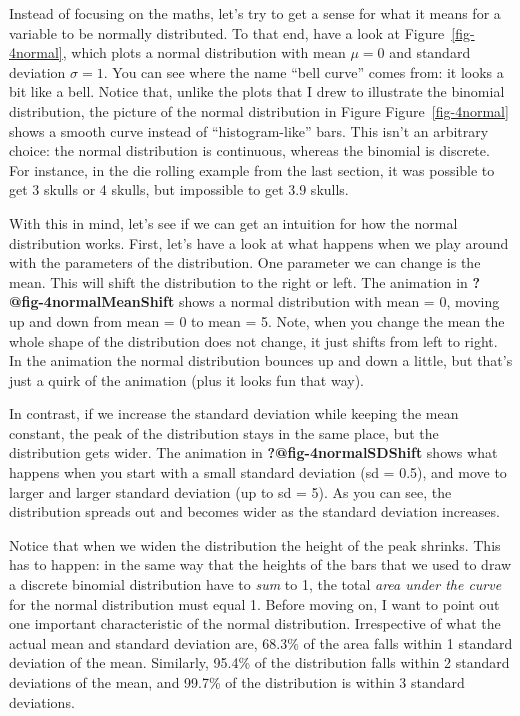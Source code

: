 \documentclass[
  letterpaper,
  DIV=11,
  numbers=noendperiod]{scrreprt}
\begin{document}
Instead of focusing on the maths, let's try to get a sense for what it
means for a variable to be normally distributed. To that end, have a
look at Figure~\ref{fig-4normal}, which plots a normal distribution with
mean \(\mu = 0\) and standard deviation \(\sigma = 1\). You can see
where the name ``bell curve'' comes from: it looks a bit like a bell.
Notice that, unlike the plots that I drew to illustrate the binomial
distribution, the picture of the normal distribution in Figure
Figure~\ref{fig-4normal} shows a smooth curve instead of
``histogram-like'' bars. This isn't an arbitrary choice: the normal
distribution is continuous, whereas the binomial is discrete. For
instance, in the die rolling example from the last section, it was
possible to get 3 skulls or 4 skulls, but impossible to get 3.9 skulls.

With this in mind, let's see if we can get an intuition for how the
normal distribution works. First, let's have a look at what happens when
we play around with the parameters of the distribution. One parameter we
can change is the mean. This will shift the distribution to the right or
left. The animation in \textbf{?@fig-4normalMeanShift} shows a normal
distribution with mean = 0, moving up and down from mean = 0 to mean =
5. Note, when you change the mean the whole shape of the distribution
does not change, it just shifts from left to right. In the animation the
normal distribution bounces up and down a little, but that's just a
quirk of the animation (plus it looks fun that way).

In contrast, if we increase the standard deviation while keeping the
mean constant, the peak of the distribution stays in the same place, but
the distribution gets wider. The animation in
\textbf{?@fig-4normalSDShift} shows what happens when you start with a
small standard deviation (sd = 0.5), and move to larger and larger
standard deviation (up to sd = 5). As you can see, the distribution
spreads out and becomes wider as the standard deviation increases.

Notice that when we widen the distribution the height of the peak
shrinks. This has to happen: in the same way that the heights of the
bars that we used to draw a discrete binomial distribution have to
\emph{sum} to 1, the total \emph{area under the curve} for the normal
distribution must equal 1. Before moving on, I want to point out one
important characteristic of the normal distribution. Irrespective of
what the actual mean and standard deviation are, 68.3\% of the area
falls within 1 standard deviation of the mean. Similarly, 95.4\% of the
distribution falls within 2 standard deviations of the mean, and 99.7\%
of the distribution is within 3 standard deviations.
\end{document}
